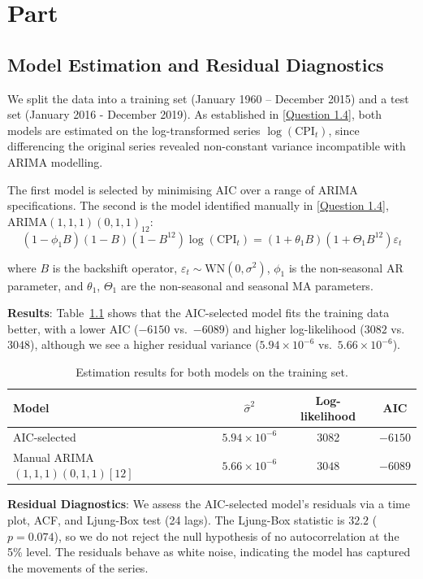 \chapter{Part}

\section{Model Estimation and Residual Diagnostics}

We split the data into a training set (January 1960 -- December 2015) and a test set (January 2016 - December 2019). As established in \ref{Question 1.4}, both models are estimated on the log-transformed series $\log(\text{CPI}_t)$, since differencing the original series revealed non-constant variance incompatible with ARIMA modelling.

The first model is selected by minimising AIC over a range of ARIMA specifications. The second is the model identified manually in \ref{Question 1.4}, ARIMA$(1,1,1)(0,1,1)_{12}$:
\[
(1 - \phi_1 B)(1 - B)(1 - B^{12})\log(\text{CPI}_t) =
(1 + \theta_1 B)(1 + \Theta_1 B^{12})\varepsilon_t
\]

where $B$ is the backshift operator, $\varepsilon_t \sim \text{WN}(0, \sigma^2)$,
$\phi_1$ is the non-seasonal AR parameter, and $\theta_1$, $\Theta_1$ are the
non-seasonal and seasonal MA parameters.

\textbf{Results}: Table~\ref{tab:fit} shows that the AIC-selected model fits the training
data better, with a lower AIC ($-6150$ vs.\ $-6089$) and higher log-likelihood ($3082$ vs.\ $3048$), although we see a higher residual variance ($5.94 \times 10^{-6}$ vs.\ $5.66\times 10^{-6}$).

\begin{table}[h]
\centering
\begin{tabular}{lccc}
\hline
Model & $\hat{\sigma}^2$ & Log-likelihood & AIC \\
\hline
AIC-selected                             & $5.94 \times 10^{-6}$ & 3082    & $-6150$   \\
Manual ARIMA$(1,1,1)(0,1,1)[12]$         & $5.66\times 10^{-6}$              & $3048$ & $-6089$ \\
\hline
\end{tabular}
\caption{Estimation results for both models on the training set.}
\label{tab:fit}
\end{table}

\textbf{Residual Diagnostics}: We assess the AIC-selected model's residuals via a time plot, ACF, and Ljung-Box test (24 lags). The Ljung-Box statistic is $32.2$ ($p = 0.074$), so we do not reject the null hypothesis of no autocorrelation at the 5\% level. The residuals behave as white noise, indicating the model has captured the movements of the series.

